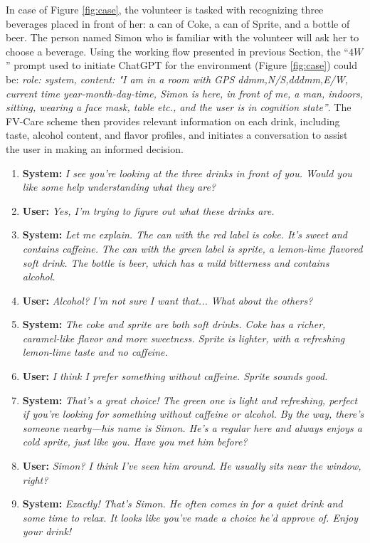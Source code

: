 \documentclass[conference]{IEEEtran}
\begin{document}
In case of Figure \ref{fig:case}, the volunteer is tasked with recognizing three beverages placed in front of her: a can of Coke, a can of Sprite, and a bottle of beer. The person named Simon who is familiar with the volunteer will ask her to choose a beverage. Using the working flow presented in previous Section, the  ``$4W$'' prompt used to initiate ChatGPT for the environment (Figure \ref{fig:case}) could be: \textit{role: system, content: "I am in a room with GPS ddmm,N/S,dddmm,E/W, current time year-month-day-time, Simon is here, in front of me, a man, indoors, sitting, wearing a face mask, table etc., and the user is in cognition state''}. The FV-Care scheme then provides relevant information on each drink, including taste, alcohol content, and flavor profiles, and initiates a conversation to assist the user in making an informed decision.

\begin{enumerate}
    \item \textbf{System:} \textit{I see you’re looking at the three drinks in front of you. Would you like some help understanding what they are?}
    
    \item \textbf{User:} \textit{Yes, I’m trying to figure out what these drinks are.}
    
    \item \textbf{System:} \textit{Let me explain. The can with the red label is coke. It’s sweet and contains caffeine. The can with the green label is sprite, a lemon-lime flavored soft drink. The bottle is beer, which has a mild bitterness and contains alcohol.}
    
    \item \textbf{User:} \textit{Alcohol? I’m not sure I want that... What about the others?}
    
    \item \textbf{System:} \textit{The coke and sprite are both soft drinks. Coke has a richer, caramel-like flavor and more sweetness. Sprite is lighter, with a refreshing lemon-lime taste and no caffeine.}
    
    \item \textbf{User:} \textit{I think I prefer something without caffeine. Sprite sounds good.}
    
    \item \textbf{System:} \textit{That’s a great choice! The green one is light and refreshing, perfect if you’re looking for something without caffeine or alcohol. By the way, there’s someone nearby—his name is Simon. He’s a regular here and always enjoys a cold sprite, just like you. Have you met him before?}
    
    \item \textbf{User:} \textit{Simon? I think I’ve seen him around. He usually sits near the window, right?}
    
    \item \textbf{System:} \textit{Exactly! That’s Simon. He often comes in for a quiet drink and some time to relax. It looks like you’ve made a choice he’d approve of. Enjoy your drink!}
\end{enumerate}
\end{document}
